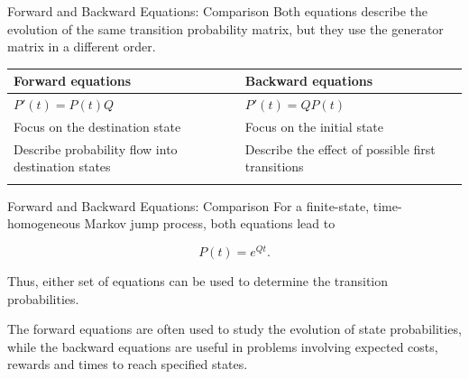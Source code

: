\documentclass[
  ignorenonframetext,
  aspectratio=169,
]{beamer}
\newcounter{none} %
\begin{document}
\begin{frame}{Forward and Backward Equations: Comparison}
\protect{}\label{forward-and-backward-equations-comparison}
Both equations describe the evolution of the same transition probability
matrix, but they use the generator matrix in a different order.

{\def\LTcaptype{none} %
\begin{longtable}[]{@{}
  >{\raggedright\arraybackslash}p{}
  >{\raggedright\arraybackslash}p{}@{}}
\toprule\noalign{}
\begin{minipage}[b]{\linewidth}\raggedright
Forward equations
\end{minipage} & \begin{minipage}[b]{\linewidth}\raggedright
Backward equations
\end{minipage} \\
\midrule\noalign{}
\endhead
\(P'(t)=P(t)Q\) & \(P'(t)=QP(t)\) \\
Focus on the destination state & Focus on the initial state \\
Describe probability flow into destination states & Describe the effect
of possible first transitions \\
\bottomrule\noalign{}
\end{longtable}
}
\end{frame}

\begin{frame}{Forward and Backward Equations: Comparison}
\protect{}\label{forward-and-backward-equations-comparison-1}
For a finite-state, time-homogeneous Markov jump process, both equations
lead to

\[
\boxed{
P(t)=e^{Qt}.
}
\]

Thus, either set of equations can be used to determine the transition
probabilities.

The forward equations are often used to study the evolution of state
probabilities, while the backward equations are useful in problems
involving expected costs, rewards and times to reach specified states.
\end{frame}
\end{document}
